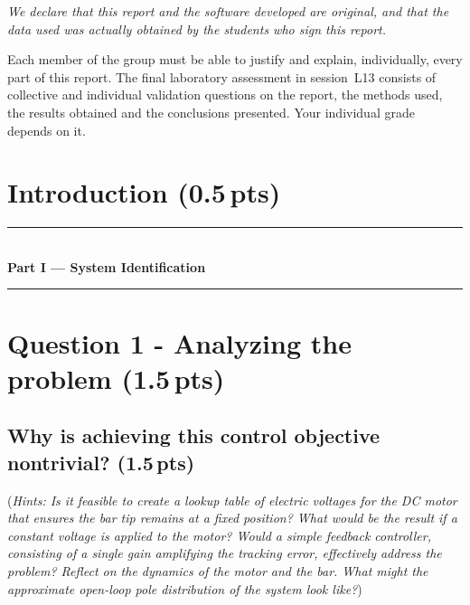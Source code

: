 \documentclass[a4paper,12pt]{article}
\begin{document}
\vspace{10pt}

\begin{tcolorbox}[declaration, title={Originality}]
\emph{We declare that this report and the software developed are original, and that the data used
was actually obtained by the students who sign this report.}
\end{tcolorbox}

\vspace{10pt}

\begin{tcolorbox}[observation]
Each member of the group must be able to justify and explain, individually, every part of this
report. The final laboratory assessment in session~L13 consists of collective and individual
validation questions on the report, the methods used, the results obtained and the conclusions
presented. Your individual grade depends on it.
\end{tcolorbox}

\newpage
\tableofcontents
\newpage


\section*{Introduction (0.5\,pts)}
\label{sec:intro}



\vspace{6pt}
\noindent\rule{\textwidth}{0.8pt}\\[-4pt]
{\Large\bfseries Part I --- System Identification}\\[-6pt]
\noindent\rule{\textwidth}{0.8pt}
\vspace{4pt}

\section{Question 1 - Analyzing the problem (1.5\,pts)}
\label{sec:q1}

\subsection{Why is achieving this control objective nontrivial? (1.5\,pts)}
(\textit{Hints: Is it feasible to create a lookup table of electric voltages for the DC motor that ensures the bar tip remains at a fixed position? What would be the result if a constant voltage is applied to the motor? Would a simple feedback controller, consisting of a single gain amplifying the tracking error, effectively address the problem? Reflect on the dynamics of the motor and the bar. What might the approximate open-loop pole distribution of the system look like?})
\vspace{15pt}
\end{document}
